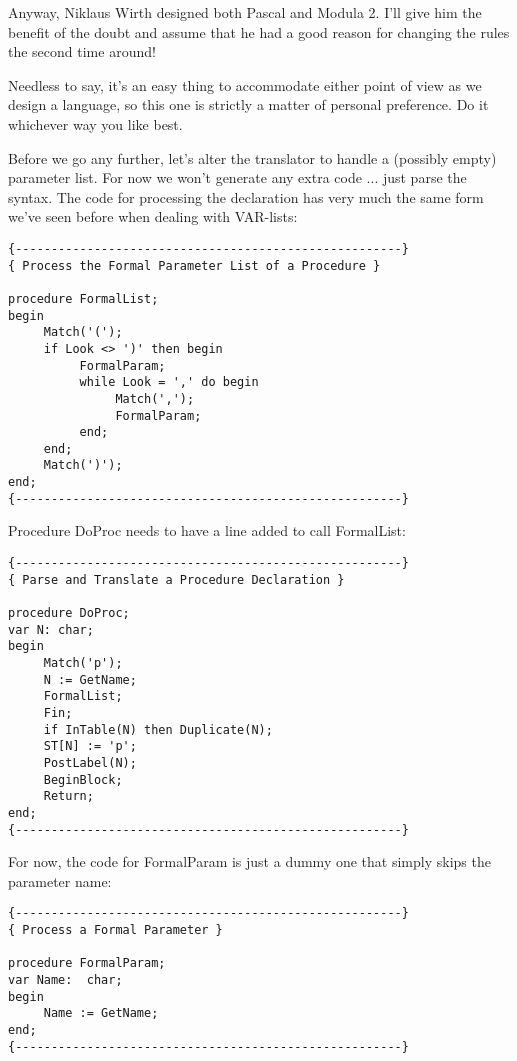 Anyway, Niklaus  Wirth  designed both Pascal and Modula 2. I'll give him the benefit of the doubt and assume that  he  had a good reason for changing the rules the second time around!

Needless to say, it's an easy thing to accommodate either point of view as we design a language, so this one is strictly a matter of personal preference. Do it whichever way you like best.

Before we go any further, let's alter the translator to  handle a (possibly empty) parameter list. For now we  won't  generate any extra code ... just parse the syntax. The  code  for  processing the declaration has very  much  the  same  form we've seen before when dealing with VAR-lists:

\begin{verbatim}
{------------------------------------------------------}
{ Process the Formal Parameter List of a Procedure }

procedure FormalList;
begin
     Match('(');
     if Look <> ')' then begin
          FormalParam;
          while Look = ',' do begin
               Match(',');
               FormalParam;
          end;
     end;
     Match(')');
end;
{------------------------------------------------------}
\end{verbatim}

Procedure DoProc needs to have a line added to call FormalList:

\begin{verbatim}
{------------------------------------------------------}
{ Parse and Translate a Procedure Declaration }

procedure DoProc;
var N: char;
begin
     Match('p');
     N := GetName;
     FormalList;
     Fin;
     if InTable(N) then Duplicate(N);
     ST[N] := 'p';
     PostLabel(N);
     BeginBlock;
     Return;
end;
{------------------------------------------------------}
\end{verbatim}

For now, the code for FormalParam is just a dummy one that simply skips the parameter name:

\begin{verbatim}
{------------------------------------------------------}
{ Process a Formal Parameter }

procedure FormalParam;
var Name:  char;
begin
     Name := GetName;
end;
{------------------------------------------------------}
\end{verbatim}

